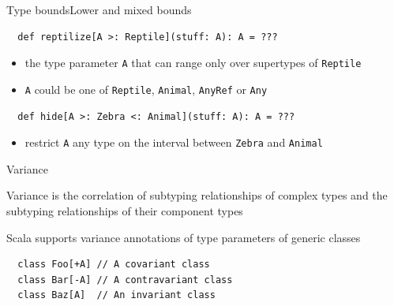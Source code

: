 \documentclass[aspectratio=169]{beamer}
\begin{document}
\begin{frame}[fragile]{Type bounds}{Lower and mixed bounds}
  \begin{verbatim}
  def reptilize[A >: Reptile](stuff: A): A = ???
  \end{verbatim}
  \begin{itemize}
    \item the type parameter \texttt{A} that can range only over \alert{supertypes}  of \texttt{Reptile}
    \item \texttt{A} could be one of \texttt{Reptile}, \texttt{Animal}, \texttt{AnyRef} or \texttt{Any}
  \end{itemize}
  \vspace{3em}
  \pause
  \begin{verbatim}
  def hide[A >: Zebra <: Animal](stuff: A): A = ???
  \end{verbatim}
  \begin{itemize}
    \item restrict \texttt{A} any type on the interval between \texttt{Zebra} and \texttt{Animal}
  \end{itemize}
\end{frame}

\begin{frame}[fragile]{Variance}
  \vspace{-2em}
  \begin{block}{}
  Variance is the correlation of subtyping relationships of complex types and the subtyping
  relationships of their component types
  \end{block}
  \vspace{-1em}
  \begin{block}{}
    Scala supports variance annotations of type parameters of \alert{generic classes}
  \end{block}
  \vspace{1em}
  \begin{verbatim}
  class Foo[+A] // A covariant class
  class Bar[-A] // A contravariant class
  class Baz[A]  // An invariant class
  \end{verbatim}
\end{frame}
\end{document}
